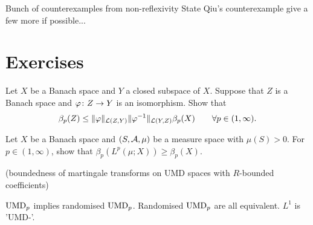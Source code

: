 Bunch of counterexamples from non-reflexivity
State Qiu's counterexample
give a few more if possible...

\section*{Exercises}

\begin{exercise}\label{ex:UMD-isomorphism}
  Let $X$ be a Banach space and $Y$ a closed subspace of $X$.
  Suppose that $Z$ is a Banach space and $\varphi \colon Z \rightarrow Y$ is an isomorphism.
  Show that 
  \begin{equation*}
    \beta_{p}(Z) \leq \|\varphi\|_{\mathcal{L}(Z,Y)} \|\varphi^{-1}\|_{\mathcal{L}(Y,Z)} \beta_{p}(X) \qquad \forall p \in (1,\infty).
  \end{equation*}
\end{exercise}

\begin{exercise}\label{ex:UMD-Lp-reverse}
  Let $X$ be a Banach space and $(S,\mathcal{A},\mu)$ be a measure space with $\mu(S) > 0$.
  For $p \in (1,\infty)$, show that $\beta_{p}(L^p(\mu;X)) \geq \beta_{p}(X)$.
\end{exercise}

\begin{exercise}
  (boundedness of martingale transforms on UMD spaces with $R$-bounded coefficients)
\end{exercise}

\begin{exercise}
  $\mathrm{UMD}_{p}$ implies randomised $\mathrm{UMD}_{p}$.
  Randomised $\mathrm{UMD}_{p}$ are all equivalent.
  $L^1$ is 'UMD-'.
\end{exercise}



